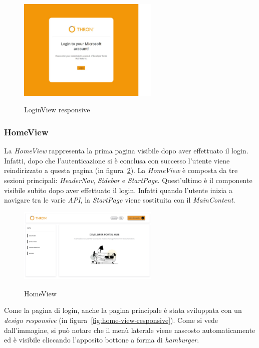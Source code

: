 \begin{figure}[ht]
  \centering
  \includegraphics[width=0.6\textwidth, alt={Pagina di login responsive dell'applicazione}]{images/frontend/LoginViewRes.jpg}
  \caption{LoginView responsive}\label{fig:login-view-responsive}
\end{figure}


\subsubsection{HomeView}\label{subsubsec:home-view}
La \textit{HomeView} rappresenta la prima pagina visibile dopo aver effettuato il login. Infatti, dopo che l'autenticazione si è conclusa con successo
l'utente viene reindirizzato a questa pagina (in figura~\ref{fig:home-view}).
La \textit{HomeView} è composta da tre sezioni principali: \textit{HeaderNav}, \textit{Sidebar} e \textit{StartPage}. Quest'ultimo è il componente visibile 
subito dopo aver effettuato il login. Infatti quando l'utente inizia a navigare tra le varie \textit{API}, la \textit{StartPage} viene sostituita con il \textit{MainContent}.

\begin{figure}[ht]
  \centering
  \includegraphics[width=0.6\textwidth, alt={Pagina principale dell'applicazione}]{images/frontend/HomeView.jpg}
  \caption{HomeView}\label{fig:home-view}
\end{figure}

Come la pagina di login, anche la pagina principale è stata sviluppata con un \textit{design responsive} (in figura~\ref{fig:home-view-responsive}).
Come si vede dall'immagine, si può notare che il menù laterale viene nascosto automaticamente ed è visibile cliccando l'apposito bottone a forma di \textit{hamburger}.

